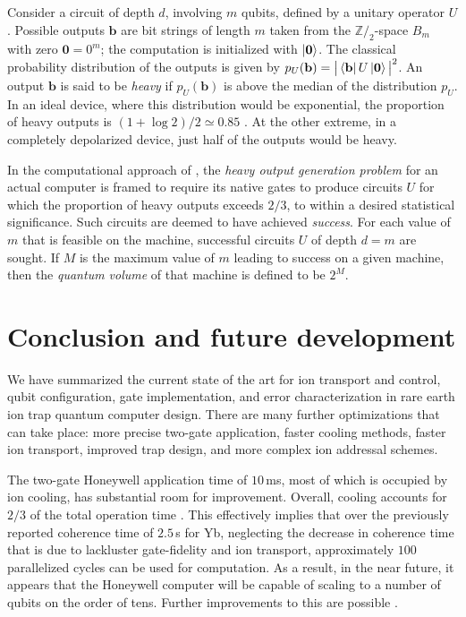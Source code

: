 \documentclass[12pt,a4paper]{amsart}
\numberwithin{equation}{section}
\theoremstyle{plain}
\theoremstyle{definition}
\begin{document}
Consider a circuit of depth $d$, involving $m$ qubits, defined by a unitary operator $U$. Possible outputs $\mathbf b$ are bit strings of length $m$ taken from the $\mathbb Z/_2$-space $B_m$ with zero $\mathbf 0=0^m$; the computation is initialized with $\ket{\mathbf 0}$. The classical probability distribution of the outputs is given by
$
p_U(\mathbf b) = \big|\bra{\mathbf b}U\ket{\mathbf 0}\big|^2
$.
An output $\mathbf b$ is said to be \emph{heavy} if $p_U(\mathbf b)$ is above the median of the distribution $p_U$. In an ideal device, where this distribution would be exponential, the proportion of heavy outputs is $(1+\log2)/2\simeq 0.85$ \cite{randBencSupr}. At the other extreme, in a completely depolarized device, just half of the outputs would be heavy. 


In the computational approach of \cite{randBencVolu}, the \emph{heavy output generation problem} for an actual computer is framed to require its native gates to produce circuits $U$ for which the proportion of heavy outputs exceeds $2/3$, to within a desired statistical significance. Such circuits are deemed to have achieved \emph{success}. For each value of $m$ that is feasible on the machine, successful circuits $U$ of depth $d=m$ are sought. If $M$ is the maximum value of $m$ leading to success on a given machine, then the \emph{quantum volume} of that machine is defined to be $2^M$.


\section{Conclusion and future development}

We have summarized the current state of the art for ion transport and control, qubit configuration, gate implementation, and error characterization in rare earth ion trap quantum computer design. There are many further optimizations that can take place: more precise two-gate application, faster cooling methods, faster ion transport, improved trap design, and more complex ion addressal schemes.


The two-gate Honeywell application time of $10\,$ms, most of which is occupied by ion cooling, has substantial room for improvement. Overall, cooling accounts for $2/3$ of the total operation time \cite{honeywell}. This effectively implies that over the previously reported coherence time of $2.5\,$s for Yb, neglecting the decrease in coherence time that is due to lackluster gate-fidelity and ion transport, approximately $100$ parallelized cycles can be used for computation. As a result, in the near future, it appears that the Honeywell computer will be capable of scaling to a number of qubits on the order of tens. Further improvements to this are possible \cite{compArchPhot}.
\end{document}

